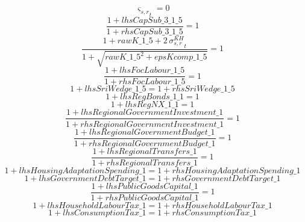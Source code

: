 \begin{dmath}
{{\varsigma_{s,r}}}_{t}=0
\end{dmath}
\begin{dmath}
\frac{1+{lhsCapSub\_3\_1\_5}}{1+{rhsCapSub\_3\_1\_5}}=1
\end{dmath}
\begin{dmath}
\frac{1+{rawK\_1\_5}+2\, {{\sigma^{KH}_{s,r}}}_{t}}{1+\sqrt{{rawK\_1\_5}^{2}+{epsKcomp\_1\_5}}}=1
\end{dmath}
\begin{dmath}
\frac{1+{lhsFocLabour\_1\_5}}{1+{rhsFocLabour\_1\_5}}=1
\end{dmath}
\begin{dmath}
1+{lhsSriWedge\_1\_5}=1+{rhsSriWedge\_1\_5}
\end{dmath}
\begin{dmath}
1+{lhsRegBonds\_1\_1}=1
\end{dmath}
\begin{dmath}
1+{lhsRegNX\_1\_1}=1
\end{dmath}
\begin{dmath}
\frac{1+{lhsRegionalGovernmentInvestment\_1}}{1+{rhsRegionalGovernmentInvestment\_1}}=1
\end{dmath}
\begin{dmath}
\frac{1+{lhsRegionalGovernmentBudget\_1}}{1+{rhsRegionalGovernmentBudget\_1}}=1
\end{dmath}
\begin{dmath}
\frac{1+{lhsRegionalTransfers\_1}}{1+{rhsRegionalTransfers\_1}}=1
\end{dmath}
\begin{dmath}
1+{lhsHousingAdaptationSpending\_1}=1+{rhsHousingAdaptationSpending\_1}
\end{dmath}
\begin{dmath}
1+{lhsGovernmentDebtTarget\_1}=1+{rhsGovernmentDebtTarget\_1}
\end{dmath}
\begin{dmath}
\frac{1+{lhsPublicGoodsCapital\_1}}{1+{rhsPublicGoodsCapital\_1}}=1
\end{dmath}
\begin{dmath}
1+{lhsHouseholdLabourTax\_1}=1+{rhsHouseholdLabourTax\_1}
\end{dmath}
\begin{dmath}
1+{lhsConsumptionTax\_1}=1+{rhsConsumptionTax\_1}
\end{dmath}
